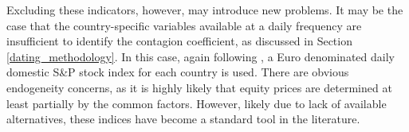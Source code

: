 \documentclass[/../base.tex]{subfiles}
\begin{document}
Excluding these indicators, however, may introduce new problems. It may be the case that the country-specific variables available at a daily frequency are insufficient to identify the contagion coefficient, as discussed in Section \ref{dating_methodology}. In this case, again following \cite{metiu2012sovereign}, a Euro denominated daily domestic S\&P stock index for each country is used. There are obvious endogeneity concerns, as it is highly likely that equity prices are determined at least partially by the common factors. However, likely due to lack of available alternatives, these indices have become a standard tool in the literature.
\end{document}
